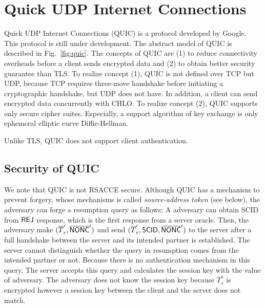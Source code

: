 \section{Quick UDP Internet Connections} \label{sec:quic}

Quick UDP Internet Connections (QUIC) is a protocol developed by Google. This protocol is still under development. The abstract model of QUIC is described in Fig.~\ref{fig:quic}. The concepts of QUIC are (1) to reduce connectivity overheads before a client sends encrypted data and (2) to obtain better security guarantee than TLS.
To realize concept (1), QUIC is not defined over TCP but UDP, because TCP requires three-move handshake before initiating a cryptographic handshake, but UDP does not have. In addition, a client can send encrypted data concurrently with CHLO.
To realize concept (2), QUIC supports only secure cipher suites. Especially, a support algorithm of key exchange is only ephemeral elliptic curve Diffie-Hellman.

Unlike TLS, QUIC does not support client authentication.

\subsection{Security of QUIC} \label{sec:quic_detail}




We note that QUIC is not RSACCE secure. Although QUIC has a mechanism to prevent forgery, whose mechanisms is called \textit{source-address token} (see below), the adversary can forge a resumption query as follows: A adversary can obtain SCID from $\mathsf{REJ}$ response, which is the first response from a server oracle. Then, the adversary make $(\overline{T}_c^{\prime}, \overline{\mathsf{NONC}}^{\prime})$ and send $(\overline{T}_c^{\prime}, \mathsf{SCID}, \overline{\mathsf{NONC}}^{\prime})$ to the server after a full handshake between the server and its intended partner is established. The server cannot distinguish whether the query in resumption comes from the intended partner or not. Because there is no authentication mechanism in this query. The server accepts this query and calculates the session key with the value of adversary. The adversary does not know the session key because $T_s^{\ast}$ is encrypted however a session key between the client and the server does not match.


